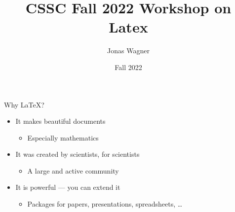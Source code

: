 \documentclass[aspectratio=169]{beamer}
\title{CSSC Fall 2022 Workshop on Latex}
\author{Jonas Wagner}
\date{Fall 2022}
\begin{document}
\begin{frame}
    \titlepage
\end{frame}




\begin{frame}{Why \LaTeX{}?}
    \begin{itemize}
        \item It makes beautiful documents
              \begin{itemize}
                  \item Especially mathematics
              \end{itemize}
        \item It was created by scientists, for scientists
              \begin{itemize}
                  \item A large and active community
              \end{itemize}
        \item It is powerful --- you can extend it
              \begin{itemize}
                  \item Packages for papers, presentations, spreadsheets, \ldots
              \end{itemize}
    \end{itemize}
\end{frame}
\end{document}

